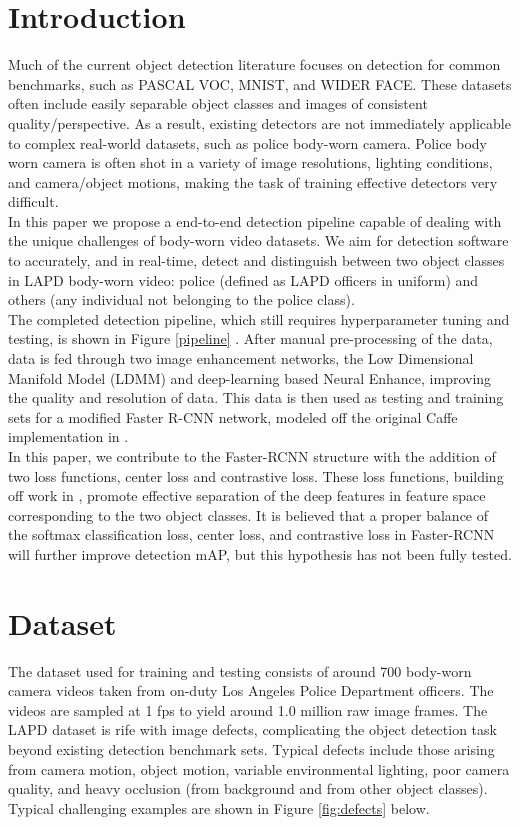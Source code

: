 \documentclass[a4paper]{article}
\begin{document}
\section{Introduction}
Much of the current object detection literature focuses on detection for common benchmarks, such as PASCAL VOC, MNIST, and WIDER FACE. These datasets often include easily separable object classes and images of consistent quality/perspective. As a result, existing detectors are not immediately applicable to complex real-world datasets, such as police body-worn camera. Police body worn camera is often shot in a variety of image resolutions, lighting conditions, and camera/object motions, making the task of training effective detectors very difficult. \\ 
\indent
In this paper we propose a end-to-end detection pipeline capable of dealing with the unique challenges of body-worn video datasets. We aim for detection software to accurately, and in real-time, detect and distinguish between two object classes in LAPD body-worn video: police (defined as LAPD officers in uniform) and others (any individual not belonging to the police class). \\
\indent
The completed detection pipeline, which still requires hyperparameter tuning and testing, is shown in Figure \ref{pipeline} . After manual pre-processing of the data, data is fed through two image enhancement networks, the Low Dimensional Manifold Model (LDMM) and deep-learning based Neural Enhance, improving the quality and resolution of data. This data is then used as testing and training sets for a modified Faster R-CNN network, modeled off the original Caffe implementation in \cite{fasterrcnn}. \\
\indent
In this paper, we contribute to the Faster-RCNN structure with the addition of two loss functions, center loss and contrastive loss. These loss functions, building off work in \cite{Wen2016_facercnn}, promote effective separation of the deep features in feature space corresponding to the two object classes. It is believed that a proper balance of the softmax classification loss, center loss, and contrastive loss in Faster-RCNN will further improve detection mAP, but this hypothesis has not been fully tested.

\section{Dataset}
The dataset used for training and testing consists of around 700 body-worn camera videos taken from on-duty Los Angeles Police Department officers. The videos are sampled at 1 fps to yield around 1.0 million raw image frames. The LAPD dataset is rife with image defects, complicating the object detection task beyond existing detection benchmark sets. Typical defects include those arising from camera motion, object motion, variable environmental lighting, poor camera quality, and heavy occlusion (from background and from other object classes). Typical challenging examples are shown in Figure \ref{fig:defects} below.
\end{document}
